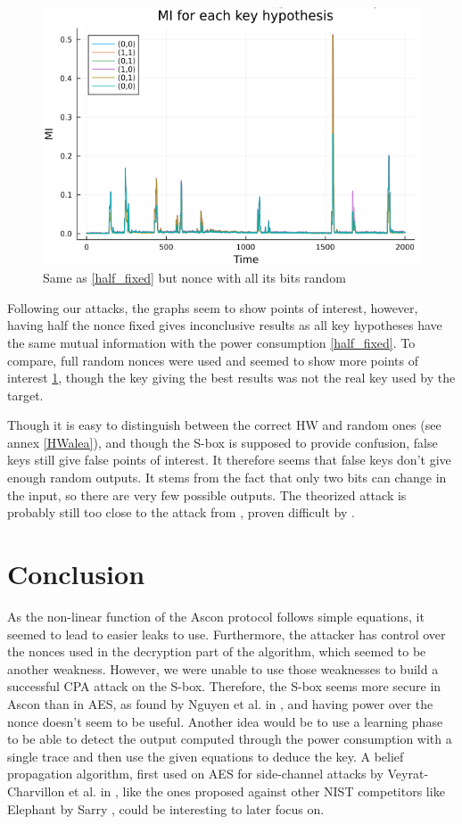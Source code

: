 \documentclass[11pt,technote]{IEEEtran}
\begin{document}
		\begin{figure}[h]
			\centering
			\includegraphics[scale=0.4]{img_files/nonces_alea}
			\caption{Same as \ref{half_fixed} but nonce with all its bits random}
			\label{all_alea}
		\end{figure}
		
		Following our attacks, the graphs seem to show points of interest, however, having half the nonce fixed gives inconclusive results as all key hypotheses have the same mutual information with the power consumption \ref{half_fixed}. To compare, full random nonces were used and seemed to show more points of interest \ref{all_alea}, though the key giving the best results was not the real key used by the target.
		
		Though it is easy to distinguish between the correct HW and random ones (see annex \ref{HWalea}), and though the S-box is supposed to provide confusion, false keys still give false points of interest. It therefore seems that false keys don't give enough random outputs. It stems from the fact that only two bits can change in the input, so there are very few possible outputs. The theorized attack is probably still too close to the attack from \cite{dl_cpa}, proven difficult by \cite{cpa_analysis}.
		
		\section{Conclusion}
		As the non-linear function of the Ascon protocol follows simple equations, it seemed to lead to easier leaks to use. Furthermore, the attacker has control over the nonces used in the decryption part of the algorithm, which seemed to be another weakness. However, we were unable to use those weaknesses to build a successful CPA attack on the S-box. Therefore, the S-box seems more secure in Ascon than in AES, as found by Nguyen et al. in \cite{cpa_analysis}, and having power over the nonce doesn't seem to be useful. Another idea would be to use a learning phase to be able to detect the output computed through the power consumption with a single trace and then use the given equations \cite{these} to deduce the key. A belief propagation algorithm, first used on AES for side-channel attacks by Veyrat-Charvillon et al. in \cite{bp_aes}, like the ones proposed against other NIST competitors like Elephant by Sarry \cite{these}, could be interesting to later focus on.
		
\end{document}
